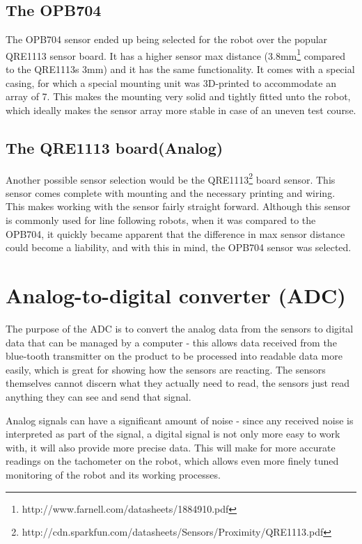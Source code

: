 \subsection{The OPB704}
The OPB704 sensor ended up being selected for the robot over the popular QRE1113 sensor board. It has a higher sensor max distance (3.8mm\footnote{http://www.farnell.com/datasheets/1884910.pdf} compared to the QRE1113s 3mm) and it has the same functionality. It comes with a special casing, for which a special mounting unit was 3D-printed to accommodate an array of 7. This makes the mounting very solid and tightly fitted unto the robot, which ideally makes the sensor array more stable in case of an uneven test course.

\subsection{The QRE1113 board(Analog)}
Another possible sensor selection would be the QRE1113\footnote{http://cdn.sparkfun.com/datasheets/Sensors/Proximity/QRE1113.pdf} board sensor. This sensor comes complete with mounting and the necessary printing and wiring. This makes working with the sensor fairly straight forward. Although this sensor is commonly used for line following robots, when it was compared to the OPB704, it quickly became apparent that the difference in max sensor distance could become a liability, and with this in mind, the OPB704 sensor was selected.


\section{Analog-to-digital converter (ADC)}
The purpose of the ADC is to convert the analog data from the sensors to digital data that can be managed by a computer - this allows data received from the blue-tooth transmitter on the product to be processed into readable data more easily, which is great for showing how the sensors are reacting. The sensors themselves cannot discern what they actually need to read, the sensors just read anything they can see and send that signal.

Analog signals can have a significant amount of noise - since any received noise is interpreted as part of the signal, a digital signal is not only more easy to work with, it will also provide more precise data. This will make for more accurate readings on the tachometer on the robot, which allows even more finely tuned monitoring of the robot and its working processes. \\

